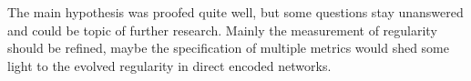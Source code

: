 \documentclass[12pt,twoside]{article}
\theoremstyle{plain}
\theoremstyle{definition}
\theoremstyle{remark}
\begin{document}
The main hypothesis was proofed quite well, but some questions stay unanswered and could be topic of further research.
Mainly the measurement of regularity should be refined, maybe the specification of multiple metrics would shed some light to the evolved regularity in direct encoded networks.

%
%
\newpage


\end{document}
